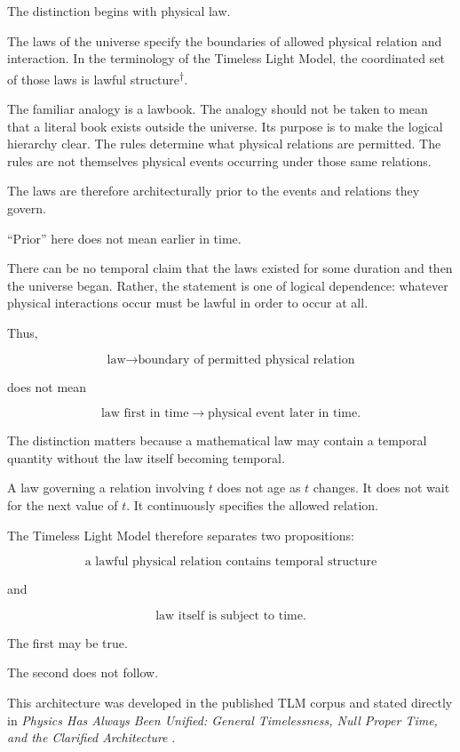 \documentclass[12pt,onecolumn]{article}
\newcommand{\defterm}[2]{#1\textsuperscript{\textcolor{gray}{\hyperref[#2]{\scriptsize$\dagger$}}}}
\theoremstyle{plain}
\theoremstyle{definition}
\theoremstyle{remark}
\begin{document}
The distinction begins with physical law.

The laws of the universe specify the boundaries of allowed physical
relation and interaction. In the terminology of the Timeless Light Model,
the coordinated set of those laws is
\defterm{lawful structure}{def:lawfulstructure}.

The familiar analogy is a lawbook. The analogy should not be taken to mean
that a literal book exists outside the universe. Its purpose is to make the
logical hierarchy clear. The rules determine what physical relations are
permitted. The rules are not themselves physical events occurring under
those same relations.

The laws are therefore architecturally prior to the events and relations
they govern.

``Prior'' here does not mean earlier in time.

There can be no temporal claim that the laws existed for some duration and
then the universe began. Rather, the statement is one of logical
dependence: whatever physical interactions occur must be lawful in order to
occur at all.

Thus,

\[
\boxed{
\text{law}
\longrightarrow
\text{boundary of permitted physical relation}
}
\]

does not mean

\[
\text{law first in time}
\longrightarrow
\text{physical event later in time}.
\]

The distinction matters because a mathematical law may contain a temporal
quantity without the law itself becoming temporal.

A law governing a relation involving \(t\) does not age as \(t\) changes.
It does not wait for the next value of \(t\). It continuously specifies the
allowed relation.

The Timeless Light Model therefore separates two propositions:

\[
\boxed{
\text{a lawful physical relation contains temporal structure}
}
\]

and

\[
\boxed{
\text{law itself is subject to time}.
}
\]

The first may be true.

The second does not follow.

This architecture was developed in the published TLM corpus and stated
directly in \textit{Physics Has Always Been Unified: General Timelessness,
Null Proper Time, and the Clarified Architecture}
\cite{unified2026}.
\end{document}
